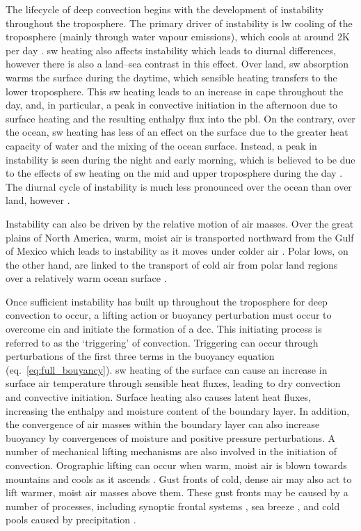 The lifecycle of deep convection begins with the development of instability throughout the troposphere. 
The primary driver of instability is \acrshort{lw} cooling of the troposphere (mainly through water vapour emissions), which cools at around 2K per day \citep{jeevanjee_simple_2020}. 
\acrshort{sw} heating also affects instability which leads to diurnal differences, however there is also a land--sea contrast in this effect. 
Over land, \acrshort{sw} absorption warms the surface during the daytime, which sensible heating transfers to the lower troposphere. 
This \acrshort{sw} heating leads to an increase in \acrshort{cape} throughout the day, and, in particular, a peak in convective initiation in the afternoon due to surface heating and the resulting enthalpy flux into the \acrshort{pbl}.
On the contrary, over the ocean, \acrshort{sw} heating has less of an effect on the surface due to the greater heat capacity of water and the mixing of the ocean surface. 
Instead, a peak in instability is seen during the night and early morning, which is believed to be due to the effects of \acrshort{sw} heating on the mid and upper troposphere during the day \citep{wall_life_2018}. 
The diurnal cycle of instability is much less pronounced over the ocean than over land, however \citep{taylor_evaluating_2017}.

Instability can also be driven by the relative motion of air masses. 
Over the great plains of North America, warm, moist air is transported northward from the Gulf of Mexico which leads to instability as it moves under colder air \citep{walters_airflow_2001}. 
Polar lows, on the other hand, are linked to the transport of cold air from polar land regions over a relatively warm ocean surface \citep{moreno-ibanez_recent_2021}.

Once sufficient instability has built up throughout the troposphere for deep convection to occur, a lifting action or buoyancy perturbation must occur to overcome \acrshort{cin} and initiate the formation of a \acrshort{dcc}.
This initiating process is referred to as the `triggering' of convection.
Triggering can occur through perturbations of the first three terms in the buoyancy equation (eq.~\ref{eq:full_bouyancy}).
\acrshort{sw} heating of the surface can cause an increase in surface air temperature through sensible heat fluxes, leading to dry convection and convective initiation.
Surface heating also causes latent heat fluxes, increasing the enthalpy and moisture content of the boundary layer.
In addition, the convergence of air masses within the boundary layer can also increase buoyancy by convergences of moisture and positive pressure perturbations.
A number of mechanical lifting mechanisms are also involved in the initiation of convection.
Orographic lifting can occur when warm, moist air is blown towards mountains and cools as it ascends \citep{hodges_distribution_1997}. 
Gust fronts of cold, dense air may also act to lift warmer, moist air masses above them. 
These gust fronts may be caused by a number of processes, including synoptic frontal systems \citep{wilson_initiation_1986, jirak_observational_2007}, sea breeze \citep{tripoli_numerical_1979, park_environmental_2020}, and cold pools caused by precipitation \citep{grant_cold_2016}.

